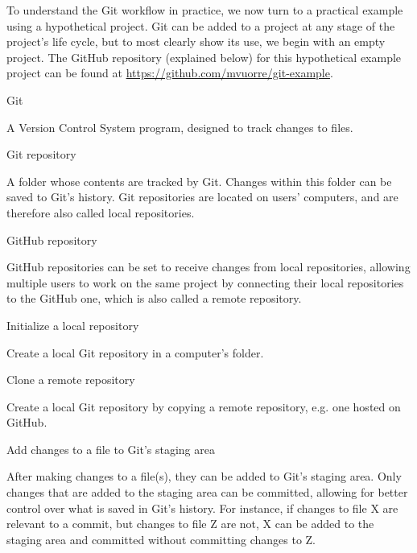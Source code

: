 \documentclass[
  american,
  ,doc,floatsintext]{apa6}
\begin{document}
To understand the Git workflow in practice, we now turn to a practical example using a hypothetical project. Git can be added to a project at any stage of the project's life cycle, but to most clearly show its use, we begin with an empty project. The GitHub repository (explained below) for this hypothetical example project can be found at \url{https://github.com/mvuorre/git-example}.

\begin{tcolorbox}[colframe=green!50!black, colback=green!5, fonttitle=\small\bfseries, fontupper=\small, title=Box 2. Main Git operations and terms.]
Git
    \begin{compactitem}
    \item A Version Control System program, designed to track changes to files.
    \end{compactitem}
Git repository
    \begin{compactitem}
    \item A folder whose contents are tracked by Git. Changes within this folder can be saved to Git's history. Git repositories are located on users' computers, and are therefore also called local repositories.
    \end{compactitem}
GitHub repository
    \begin{compactitem}
    \item GitHub repositories can be set to receive changes from local repositories, allowing multiple users to work on the same project by connecting their local repositories to the GitHub one, which is also called a remote repository. 
    \end{compactitem}
Initialize a local repository
    \begin{compactitem}
    \item Create a local Git repository in a computer's folder. 
    \end{compactitem}
Clone a remote repository
    \begin{compactitem}
    \item Create a local Git repository by copying a remote repository, e.g. one hosted on GitHub.
    \end{compactitem}
Add changes to a file to Git's staging area
    \begin{compactitem}
    \item After making changes to a file(s), they can be added to Git's staging area. Only changes that are added to the staging area can be committed, allowing for better control over what is saved in Git's history. For instance, if changes to file X are relevant to a commit, but changes to file Z are not, X can be added to the staging area and committed without committing changes to Z.

\end{compactitem}
\end{tcolorbox}
\end{document}
